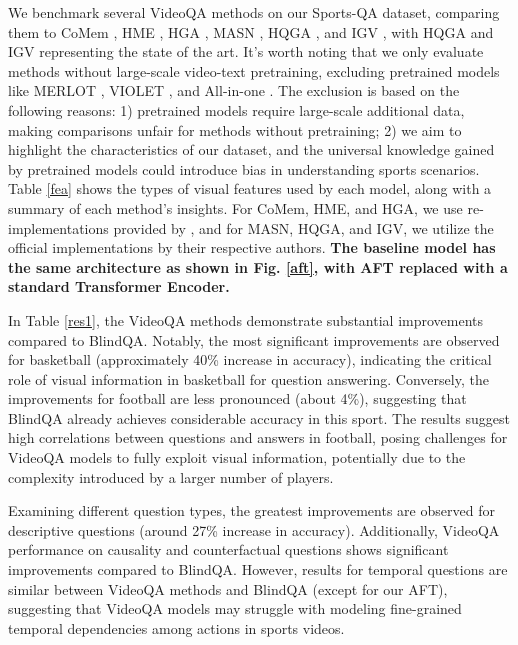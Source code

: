 {We benchmark several VideoQA methods on our Sports-QA dataset, comparing them to CoMem \citep{gao2018motion}, HME \citep{fan2019heterogeneous}, HGA \citep{jiang2020reasoning}, MASN \citep{seo2021attend}, HQGA \citep{xiao2022video}, and IGV \citep{li2022invariant}, with HQGA \citep{xiao2022video} and IGV \citep{li2022invariant} representing the state of the art. It's worth noting that we only evaluate methods without large-scale video-text pretraining, excluding pretrained models like MERLOT \citep{zellers2021merlot}, VIOLET \citep{fu2021violet}, and All-in-one \citep{wang2022all}. The exclusion is based on the following reasons: 1) pretrained models require large-scale additional data, making comparisons unfair for methods without pretraining; 2) we aim to highlight the characteristics of our dataset, and the universal knowledge gained by pretrained models could introduce bias in understanding sports scenarios. Table \ref{fea} shows the types of visual features used by each model, along with a summary of each method's insights. For CoMem, HME, and HGA, we use re-implementations provided by \citep{xiao2021next}, and for MASN, HQGA, and IGV, we utilize the official implementations by their respective authors. \textbf{The baseline model has the same architecture as shown in Fig. \ref{aft}, with AFT replaced with a standard Transformer Encoder.}




In Table \ref{res1}, the VideoQA methods demonstrate substantial improvements compared to BlindQA. Notably, the most significant improvements are observed for basketball (approximately 40\% increase in accuracy), indicating the critical role of visual information in basketball for question answering. Conversely, the improvements for football are less pronounced (about 4\%), suggesting that BlindQA already achieves considerable accuracy in this sport. The results suggest high correlations between questions and answers in football, posing challenges for VideoQA models to fully exploit visual information, potentially due to the complexity introduced by a larger number of players.

Examining different question types, the greatest improvements are observed for descriptive questions (around 27\% increase in accuracy). Additionally, VideoQA performance on causality and counterfactual questions shows significant improvements compared to BlindQA. However, results for temporal questions are similar between VideoQA methods and BlindQA (except for our AFT), suggesting that VideoQA models may struggle with modeling fine-grained temporal dependencies among actions in sports videos.

}
